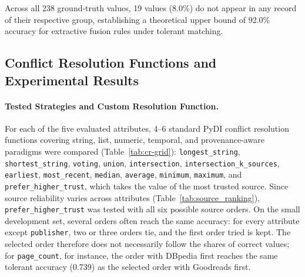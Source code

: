 \documentclass[runningheads]{llncs}
\begin{document}
Across all 238 ground-truth values, 19 values (8.0\%) do not appear in any record of their respective group, establishing a theoretical upper bound of 92.0\% accuracy for extractive fusion rules under tolerant matching.

\subsection{Conflict Resolution Functions and Experimental Results}

\paragraph{Tested Strategies and Custom Resolution Function.}
\begin{sloppypar}
For each of the five evaluated attributes, 4--6 standard PyDI conflict resolution functions covering string, list, numeric, temporal, and provenance-aware paradigms were compared (Table~\ref{tab:cr-grid}): \texttt{longest\_string}, \texttt{shortest\_string}, \texttt{voting}, \texttt{union}, \texttt{intersection}, \texttt{intersection\_k\_sources}, \texttt{earliest}, \texttt{most\_recent}, \texttt{median}, \texttt{average}, \texttt{minimum}, \texttt{maximum}, and \texttt{prefer\_higher\_trust}, which takes the value of the most trusted source. Since source reliability varies across attributes (Table~\ref{tab:source_ranking}), \texttt{prefer\_higher\_trust} was tested with all six possible source orders. On the small development set, several orders often reach the same accuracy: for every attribute except \texttt{publisher}, two or three orders tie, and the first order tried is kept. The selected order therefore does not necessarily follow the shares of correct values; for \texttt{page\_count}, for instance, the order with DBpedia first reaches the same tolerant accuracy (0.739) as the selected order with Goodreads first.
\end{sloppypar}
\end{document}
